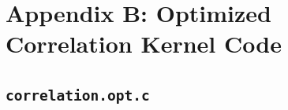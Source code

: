 \documentclass[11pt]{article}
\newif\ifcode %
\begin{document}
\section{Appendix B: Optimized Correlation Kernel Code}

\subsection{\texttt{correlation.opt.c}}
\ifcode
  
\fi
\newpage



\end{document}
